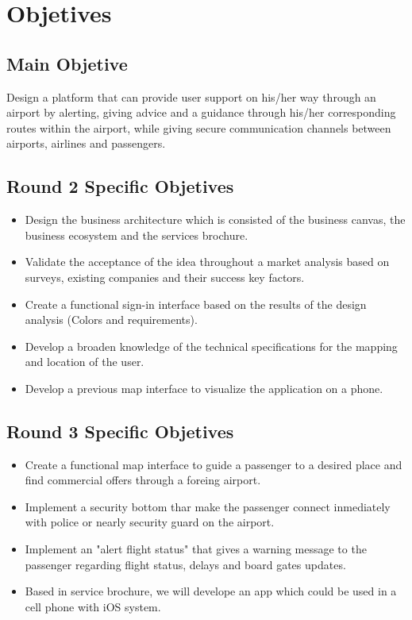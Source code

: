 \documentclass[12pt]{article}
\begin{document}
\section{Objetives}

\subsection{Main Objetive}

Design a platform that can provide user support on his/her way through an airport by alerting, giving advice and a guidance through his/her corresponding routes within the airport, while giving secure communication channels between airports, airlines and passengers.\\
[0.7cm]

\subsection{Round 2 Specific Objetives}
\begin{itemize}
	\item Design the business architecture which is consisted of the business canvas, the business ecosystem and the services brochure.
	\item Validate the acceptance of the idea throughout a market analysis based on surveys, existing companies and their success key factors.
	\item Create a functional sign-in interface based on the results of the design analysis (Colors and requirements). 
	\item Develop a broaden knowledge of the technical specifications for the mapping and location of the user.
	\item Develop a previous map interface to visualize the application on a phone.\\
[0.7cm]
\end{itemize}

\subsection{Round 3 Specific Objetives}
\begin{itemize}
	\item Create a functional map interface to guide a passenger to a desired place and find commercial offers through a foreing airport.
	\item Implement a security bottom thar make the passenger connect inmediately with police or nearly security guard on the airport.
	\item Implement an "alert flight status" that gives a warning message to the passenger regarding flight status, delays and board gates updates. 
	\item Based in service brochure, we will develope an app which could be used in a cell phone with iOS system.\\
[0.6cm]
\end{itemize}
\end{document}

